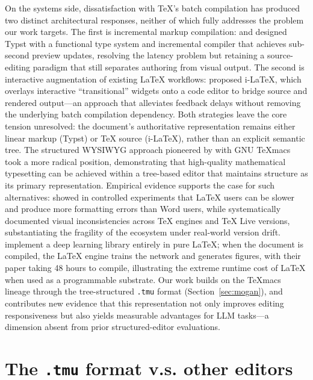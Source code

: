 On the systems side, dissatisfaction with \TeX{}'s batch compilation has produced two distinct architectural responses, neither of which fully addresses the problem our work targets. The first is incremental markup compilation: \citet{madje2023typst} and \citet{haug2022typst} designed Typst with a functional type system and incremental compiler that achieves sub-second preview updates, resolving the latency problem but retaining a source-editing paradigm that still separates authoring from visual output. The second is interactive augmentation of existing \LaTeX{} workflows: \citet{gobert2022ilatex} proposed i-\LaTeX{}, which overlays interactive ``transitional'' widgets onto a code editor to bridge source and rendered output---an approach that alleviates feedback delays without removing the underlying batch compilation dependency. Both strategies leave the core tension unresolved: the document's authoritative representation remains either linear markup (Typst) or \TeX{} source (i-\LaTeX{}), rather than an explicit semantic tree. The structured WYSIWYG approach pioneered by \citet{van_der_hoeven_gnu_2001} with GNU \TeX{}macs took a more radical position, demonstrating that high-quality mathematical typesetting can be achieved within a tree-based editor that maintains structure as its primary representation. Empirical evidence supports the case for such alternatives: \citet{knauff2014efficiency} showed in controlled experiments that \LaTeX{} users can be slower and produce more formatting errors than Word users, while \citet{tan2024inconsistencies} systematically documented visual inconsistencies across \TeX{} engines and TeX Live versions, substantiating the fragility of the ecosystem under real-world version drift. \citet{gardner2025neuralatex} implement a deep learning library entirely in pure \LaTeX{}; when the document is compiled, the \LaTeX{} engine trains the network and generates figures, with their paper taking 48 hours to compile, illustrating the extreme runtime cost of \LaTeX{} when used as a programmable substrate. Our work builds on the \TeX{}macs lineage through the tree-structured \texttt{.tmu} format (Section~\ref{sec:mogan}), and contributes new evidence that this representation not only improves editing responsiveness but also yields measurable advantages for LLM tasks---a dimension absent from prior structured-editor evaluations.

\section{The \texttt{.tmu} format v.s. other editors}
\label{app:mvse}

